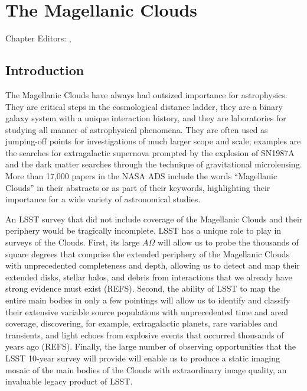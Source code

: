 
\chapter{The Magellanic Clouds}
\def\chpname{MCs}\label{chp:\chpname}

Chapter Editors:
,

%

\section{Introduction}

The Magellanic Clouds have always had outsized importance for
astrophysics.  They are critical steps in the cosmological distance
ladder, they are a binary galaxy system with a unique interaction
history, and they are laboratories for studying all manner of
astrophysical phenomena.  They are often used as jumping-off points
for investigations of much larger scope and scale; examples are the
searches for extragalactic supernova prompted by the explosion of
SN1987A and the dark matter searches through the technique of
gravitational microlensing.  More than 17,000 papers in the NASA ADS
include the words ``Magellanic Clouds'' in their abstracts or as part
of their keywords, highlighting their importance for a wide variety of
astronomical studies.

An LSST survey that did not include coverage of the Magellanic Clouds
and their periphery would be tragically incomplete.  LSST has a unique
role to play in surveys of the Clouds.  First, its large $A\Omega$
will allow us to probe the thousands of square degrees that comprise
the extended periphery of the Magellanic Clouds with unprecedented
completeness and depth, allowing us to detect and map their extended
disks, stellar halos, and debris from interactions that we already
have strong evidence must exist (REFS).  Second, the ability of LSST
to map the entire main bodies in only a few pointings will allow us to
identify and classify their extensive variable source populations with
unprecedented time and areal coverage, discovering, for example,
extragalactic planets, rare variables and transients, and light echoes
from explosive events that occurred thousands of years ago (REFS).
Finally, the large number of observing opportunities that the LSST
10-year survey will provide will enable us to produce a static imaging
mosaic of the main bodies of the Clouds with extraordinary image
quality, an invaluable legacy product of LSST.

